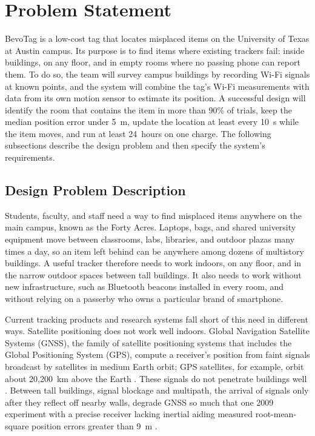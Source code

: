 \documentclass[12pt,letterpaper]{article}
\begin{document}
\section{Problem Statement}
BevoTag is a low-cost tag that locates misplaced items on the University of Texas at Austin campus.
Its purpose is to find items where existing trackers fail: inside buildings, on any floor, and in
empty rooms where no passing phone can report them. To do so, the team will survey campus buildings
by recording Wi-Fi signals at known points, and the system will combine the tag's Wi-Fi
measurements with data from its own motion sensor to estimate its position. A successful design
will identify the room that contains the item in more than 90\% of trials, keep the median position
error under 5~m, update the location at least every 10~s while the item moves, and run at least
24~hours on one charge. The following subsections describe the design problem and then specify the
system's requirements.

\subsection{Design Problem Description}
Students, faculty, and staff need a way to find misplaced items anywhere on the main campus, known
as the Forty Acres. Laptops, bags, and shared university equipment move between classrooms, labs,
libraries, and outdoor plazas many times a day, so an item left behind can be anywhere among dozens
of multistory buildings. A useful tracker therefore needs to work indoors, on any floor, and in the
narrow outdoor spaces between tall buildings. It also needs to work without new infrastructure,
such as Bluetooth beacons installed in every room, and without relying on a passerby who owns a
particular brand of smartphone.

Current tracking products and research systems fall short of this need in different ways.
Satellite positioning does not work well indoors. Global Navigation Satellite Systems (GNSS), the
family of satellite positioning systems that includes the Global Positioning System (GPS), compute a
receiver's position from faint signals broadcast by satellites in medium Earth orbit; GPS
satellites, for example, orbit about 20,200~km above the Earth \cite{gps}. These signals do not
penetrate buildings well \cite{hechan}. Between tall buildings, signal blockage and multipath, the
arrival of signals only after they reflect off nearby walls, degrade GNSS so much that one 2009
experiment with a precise receiver lacking inertial aiding measured root-mean-square position errors
greater than 9~m \cite{yoder}.
\end{document}

